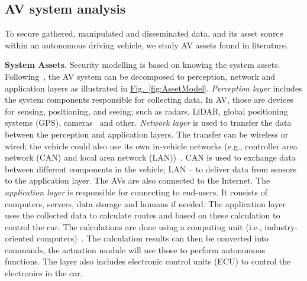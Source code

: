\documentclass[runningheads]{llncs}
\begin{document}
\subsection{AV system analysis}

To secure gathered, manipulated and disseminated data, and its asset source within an autonomous driving vehicle, we study AV assets found in literature.

\textbf{System Assets}. Security modelling is based on knowing the system assets.
Following~\cite{AffiaEtAl2019}, the AV system can be decomposed to perception, network and application layers as illustrated in \hyperref[fig:AssetModel]{Fig.~\ref{fig:AssetModel}}. \textit{Perception layer} includes 
the system components responsible for collecting data. In AV, those are devices for sensing, positioning, and seeing; such as radars, LiDAR, global positioning systems (GPS), cameras~\cite{YanEtAl2016,ThingEtAL2016,PetitEtAl2015} and other. \textit{Network layer} is used to transfer the data between the perception and application layers. The transfer can be wireless or wired; the vehicle could also use its own in-vehicle networks (e.g., controller area network (CAN) and local area network (LAN))~\cite{ThingEtAL2016}. CAN is used to exchange data between different components in the vehicle; LAN -- to deliver data from sensors to the application layer. The AVs are also connected to the Internet. The \textit{application layer} is responsible for connecting to end-users. It consists of computers, servers, data storage and humans if needed. The application layer uses the collected data to calculate routes and based on these calculation to control the car. The calculations are done using a computing unit (i.e., industry-oriented computers)~\cite{ThingEtAL2016}. The calculation results can then be converted into commands, the actuation module will use those to perform autonomous functions. The layer also includes electronic control units (ECU) to control the electronics in the car.
\end{document}
